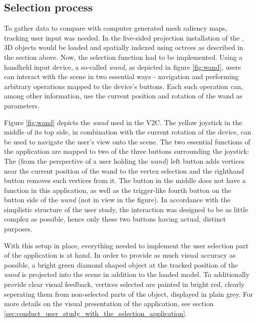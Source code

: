 		\subsection{Selection process}
		\label{sec:selection_process}

To gather data to compare with computer generated mesh saliency maps, tracking user input was needed. In the five-sided projection installation of the \cite{v2c}, 3D objects would be loaded and spatially indexed using octrees as described in the section above. Now, the selection function had to be implemented. Using a handheld input device, a so-called \textit{wand}, as depicted in figure \ref{fig:wand}, users can interact with the scene in two essential ways - navigation and performing arbitrary operations mapped to the device's buttons. Each such operation can, among other information, use the current position and rotation of the wand as parameters.

Figure \ref{fig:wand} depicts the \textit{wand} used in the V2C. The yellow joystick in the middle of its top side, in combination with the current rotation of the device, can be used to navigate the user's view onto the 
scene. The two essential functions of the application are mapped to two of the three buttons surrounding the joystick: The (from the perspective of a user holding the \textit{wand}) left button adds vertices near the current position of the wand to the vertex selection and the righthand button removes such vertices from it. The button in the middle does not have a function in this application, as well as the trigger-like fourth button on the button side of the \textit{wand} (not in view in the figure).
In accordance with the simplistic structure of the user study, the interaction was designed to be as little complex as possible, hence only these two buttons having actual, distinct purposes. 

With this setup in place, everything needed to implement the user selection part of the application is at hand. In order to provide as much visual accuracy as possible, a bright green diamond shaped object at the tracked position of the \textit{wand} is projected into the scene in addition to the loaded model. To additionally provide clear visual feedback, vertices selected are painted in bright red, clearly seperating them from non-selected parts of the object, displayed in plain grey. For more details on the visual presentation of the application, see section \ref{sec:conduct_user_study_with_the_selection_application}.

